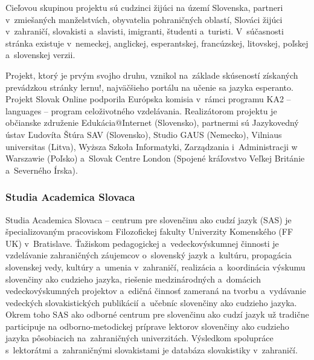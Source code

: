 \begin{multicols}{2}

Cieľovou skupinou projektu sú cudzinci žijúci na území Slovenska,
partneri v~zmiešaných manželstvách, obyvatelia pohraničných
oblastí, Slováci žijúci v~zahraničí, slovakisti a~slavisti,
imigranti, študenti a~turisti. V~súčasnosti stránka existuje
v~nemeckej, anglickej, esperantskej, francúzskej, litovskej, poľskej
a~slovenskej verzii.

Projekt, ktorý je prvým svojho druhu, vznikol na~základe skúseností
získaných prevádzkou stránky
lernu!\cite{f7}, najväčšieho portálu na
učenie sa jazyka esperanto. Projekt Slovak Online podporila Európska
komisia v~rámci programu KA2 – languages – program celoživotného
vzdelávania. Realizátorom projektu je občianske združenie
Edukácia@Internet (Slovensko), partnermi sú Jazykovedný ústav
Ľudovíta Štúra SAV (Slovensko), Studio GAUS (Nemecko), Vilniaus
universitas (Litva), Wyższa Szkoła Informatyki, Zarządzania
i~Administracji w Warszawie (Poľsko) a~Slovak Centre London (Spojené
kráľovstvo Veľkej Británie a~Severného Írska).

\subsubsection{Studia Academica Slovaca}
Studia Academica Slovaca -- centrum pre slovenčinu ako cudzí jazyk (SAS) je špecializovaným pracoviskom Filozofickej fakulty Univerzity Komenského (FF UK) v~Bratislave. Ťažiskom pedagogickej a~vedeckovýskumnej činnosti je vzdelávanie zahraničných záujemcov o~slovenský jazyk a~kultúru, propagácia slovenskej vedy, kultúry a~umenia v~zahraničí, realizácia a~koordinácia výskumu slovenčiny ako cudzieho jazyka, riešenie medzinárodných a~domácich vedeckovýskumných projektov a~edičná činnosť zameraná na tvorbu a~vydávanie vedeckých slovakistických publikácií a~učebníc slovenčiny ako cudzieho jazyka. Okrem toho SAS ako odborné centrum pre slovenčinu ako cudzí jazyk už tradične participuje na odborno-metodickej príprave lektorov slovenčiny ako cudzieho jazyka pôsobiacich na~zahraničných univerzitách. Výsledkom spolupráce s~lektorátmi a~zahraničnými slovakistami je databáza slovakistiky v~zahraničí.



\end{multicols}
